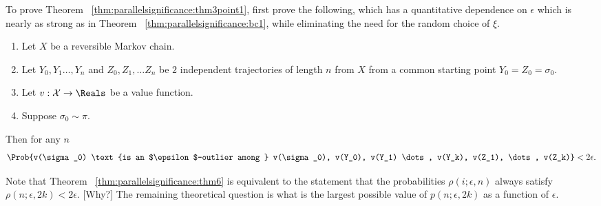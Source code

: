 \documentclass[12pt]{article}
\begin{document}
\begin{remark}
    To prove Theorem~%
    \ref{thm:parallelsignificance:thm3point1}, first prove the following, which
    has a quantitative dependence on \( \epsilon \) which is nearly as
    strong as in Theorem~%
    \ref{thm:parallelsignificance:bc1}, while eliminating the need for the
    random choice of \( \xi \).
\end{remark}

\begin{theorem}
    \label{thm:parallelsignificance:thm6}
    \begin{enumerate}
        \item
            Let \( X \) be a reversible Markov chain.
        \item
            Let \( Y_0, Y_1 \dots, Y_n \) and \( Z_0, Z_1, \dots Z_n \)
            be \( 2 \) independent trajectories of length \( n \) from \(
            X \) from a common starting point \( Y_0 = Z_0 = \sigma_0 \).
        \item
            Let \( v :  \mathcal{X} \to \Reals \) be a value function.
        \item
            Suppose \( \sigma_0 \sim \pi \).
    \end{enumerate}
    Then for any \( n \)
    \[
        \Prob{v(\sigma_0) \text{is an $\epsilon$-outlier among } v(\sigma_0),
        v(Y_0), v(Y_1) \dots, v(Y_k), v(Z_1), \dots, v(Z_k)} < 2
        \epsilon.
    \]
\end{theorem}

\begin{remark}
    Note that Theorem~%
    \ref{thm:parallelsignificance:thm6} is equivalent to the statement that the
    probabilities \( \rho(i; \epsilon, n) \) always satisfy \( \rho(n;
    \epsilon, 2k) < 2\epsilon \). [Why?]  The remaining theoretical question is
    what is the largest possible value of \( p(n; \epsilon, 2k) \) as a
    function of \( \epsilon \).
\end{remark}
\end{document}
